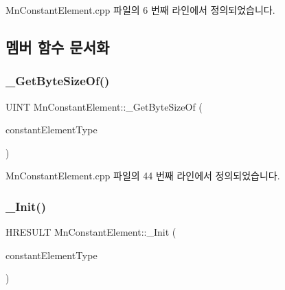 Mn\+Constant\+Element.\+cpp 파일의 6 번째 라인에서 정의되었습니다.



\subsection{멤버 함수 문서화}
\mbox{\label{class_m_n_l_1_1_mn_constant_element_a34b4574387f535a74ab325a43649ceef}} 
\subsubsection{\texorpdfstring{\+\_\+\+Get\+Byte\+Size\+Of()}{\_GetByteSizeOf()}}
{\footnotesize\ttfamily U\+I\+NT Mn\+Constant\+Element\+::\+\_\+\+Get\+Byte\+Size\+Of (\begin{DoxyParamCaption}\item[{const \hyperlink{namespace_m_n_l_a7d0c6fcd5ada7e43f4059b8a9b4afb49}{Mn\+Constant\+Element\+Type} \&}]{constant\+Element\+Type }\end{DoxyParamCaption})\hspace{0.3cm}{\ttfamily [private]}}



Mn\+Constant\+Element.\+cpp 파일의 44 번째 라인에서 정의되었습니다.

\mbox{\label{class_m_n_l_1_1_mn_constant_element_a226616b9e6e135a920943803bd8d651d}} 
\subsubsection{\texorpdfstring{\+\_\+\+Init()}{\_Init()}}
{\footnotesize\ttfamily H\+R\+E\+S\+U\+LT Mn\+Constant\+Element\+::\+\_\+\+Init (\begin{DoxyParamCaption}\item[{const \hyperlink{namespace_m_n_l_a7d0c6fcd5ada7e43f4059b8a9b4afb49}{Mn\+Constant\+Element\+Type} \&}]{constant\+Element\+Type }\end{DoxyParamCaption})\hspace{0.3cm}{\ttfamily [private]}}



